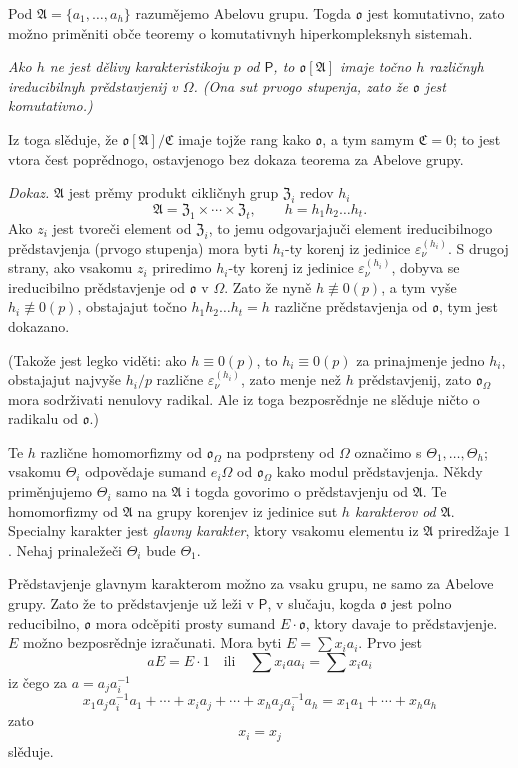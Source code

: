 \documentclass[11pt]{article}
\begin{document}
Pod \(\mathfrak A=\{a_1,\ldots,a_h\}\) razumějemo Abelovu grupu. Togda \(\mathfrak o\) jest komutativno, zato možno priměniti obče teoremy o komutativnyh hiperkompleksnyh sistemah.

\emph{Ako \(h\) ne jest dělivy karakteristikoju \(p\) od \(\mathsf P\), to \(\mathfrak o[\mathfrak A]\) imaje točno \(h\) različnyh ireducibilnyh prědstavjenij v \(\Omega\). (Ona sut prvogo stupenja, zato že \(\mathfrak o\) jest komutativno.)}

Iz toga slěduje, že \(\mathfrak o[\mathfrak A]/\mathfrak C\) imaje tojže rang kako \(\mathfrak o\), a tym samym \(\mathfrak C=0\); to jest vtora čest poprědnogo, ostavjenogo bez dokaza teorema za Abelove grupy.

\emph{Dokaz.} \(\mathfrak A\) jest prěmy produkt cikličnyh grup \(\mathfrak Z_i\) redov \(h_i\)
\[
\mathfrak A=\mathfrak Z_1\times\cdots\times\mathfrak Z_t,\qquad
h=h_1h_2\ldots h_t .
\]
Ako \(z_i\) jest tvoreči element od \(\mathfrak Z_i\), to jemu odgovarjajuči element ireducibilnogo prědstavjenja (prvogo stupenja) mora byti \(h_i\)-ty korenj iz jedinice \(\varepsilon_\nu^{(h_i)}\). S drugoj strany, ako vsakomu \(z_i\) priredimo \(h_i\)-ty korenj iz jedinice \(\varepsilon_\nu^{(h_i)}\), dobyva se ireducibilno prědstavjenje od \(\mathfrak o\) v \(\Omega\). Zato že nyně \(h\not\equiv0(p)\), a tym vyše \(h_i\not\equiv0(p)\), obstajajut točno \(h_1h_2\ldots h_t=h\) različne prědstavjenja od \(\mathfrak o\), tym jest dokazano.

(Takože jest legko viděti: ako \(h\equiv0(p)\), to \(h_i\equiv0(p)\) za prinajmenje jedno \(h_i\), obstajajut najvyše \(h_i/p\) različne \(\varepsilon_\nu^{(h_i)}\), zato menje než \(h\) prědstavjenij, zato \(\mathfrak o_\Omega\) mora sodrživati nenulovy radikal. Ale iz toga bezposrědnje ne slěduje ničto o radikalu od \(\mathfrak o\).)

Te \(h\) različne homomorfizmy od \(\mathfrak o_\Omega\) na podprsteny od \(\Omega\) označimo s \(\Theta_1,\ldots,\Theta_h\); vsakomu \(\Theta_i\) odpovědaje sumand \(e_i\Omega\) od \(\mathfrak o_\Omega\) kako modul prědstavjenja. Někdy priměnjujemo \(\Theta_i\) samo na \(\mathfrak A\) i togda govorimo o prědstavjenju od \(\mathfrak A\). Te homomorfizmy od \(\mathfrak A\) na grupy korenjev iz jedinice sut \emph{\(h\) karakterov od \(\mathfrak A\)}. Specialny karakter jest \emph{glavny karakter}, ktory vsakomu elementu iz \(\mathfrak A\) priredžaje \(1\). Nehaj prinaležeči \(\Theta_i\) bude \(\Theta_1\).

Prědstavjenje glavnym karakterom možno za vsaku grupu, ne samo za Abelove grupy. Zato že to prědstavjenje už leži v \(\mathsf P\), v slučaju, kogda \(\mathfrak o\) jest polno reducibilno, \(\mathfrak o\) mora odcěpiti prosty sumand \(E\cdot\mathfrak o\), ktory davaje to prědstavjenje. \(E\) možno bezposrědnje izračunati. Mora byti \(E=\sum x_i a_i\). Prvo jest
\[
aE=E\cdot 1\quad\text{ili}\quad \sum x_i a a_i=\sum x_i a_i
\]
iz čego za \(a=a_j a_i^{-1}\)
\[
x_1a_ja_i^{-1}a_1+\cdots+x_i a_j+\cdots+x_ha_ja_i^{-1}a_h
=x_1a_1+\cdots+x_ha_h
\]
zato
\[
x_i=x_j
\]
slěduje.
\end{document}
